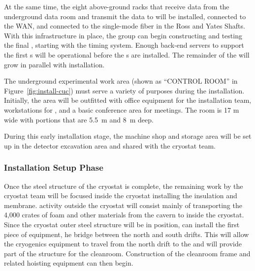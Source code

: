 At the same time, the eight above-ground  racks that receive data from the underground data room and  transmit the data to  will %
be installed, connected to the WAN, and connected to the single-mode fiber in the Ross and Yates Shafts.  With this infrastructure in place, the  group can begin constructing and testing the final  , starting with the %
timing system. %
Enough  back-end servers to support the first s will be operational before the s are installed.  The remainder of the  will grow in parallel with  installation.

The underground experimental work area (shown as ``CONTROL ROOM'' in Figure~\ref{fig:install-cuc}) must serve a variety of purposes during the  installation. Initially, the area will be outfitted with office equipment for the installation team, workstations for , and a basic conference area for meetings. The room is 17 \si{m} wide with portions that are \SI{5.5}{m} and \SI{8}{m} deep.

During this early installation stage, the machine shop and  storage area will %
be set up in the detector excavation area and %
shared with the cryostat team. 

\subsubsection{Installation Setup Phase}
\label{sec:fdsp-tc-inst-setup}

Once the steel structure of the cryostat is complete, the remaining work by the  cryostat team will be focused inside the cryostat installing the insulation and membrane.  
 activity outside the cryostat will %
consist mainly of %
transporting the 4,000 crates of foam and other materials from the cavern to inside the cryostat. %
Since the cryostat outer steel structure will be in position,  can install 
the first piece of equipment, %
he bridge between the north and south drifts. 
This will allow the cryogenics equipment to travel from the north drift to the  and will provide part of the structure for the cleanroom. 
Construction of the cleanroom frame and related hoisting equipment can then begin. 



